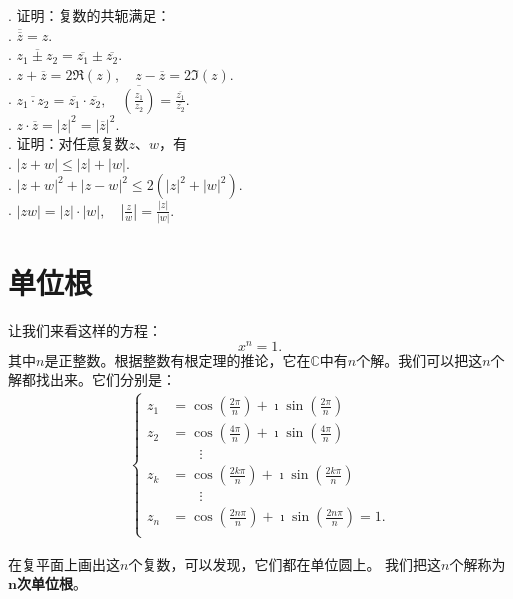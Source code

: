 \documentclass[12pt,UTF8]{ctexbook}
\begin{document}
\begin{xt}
    . 证明：复数的共轭满足：\\
    . $ \overline{\overline{z}} = z.$ \\
    . $ \overline{z_1 \pm z_2} = \overline{z_1}\pm \overline{z_2}.$ \\
    . $ z + \overline{z} = 2\Re(z), \quad z - \overline{z} = 2\Im(z).$\\
    . $\displaystyle\overline{z_1 \cdot z_2} = \overline{z_1}\cdot \overline{z_2}, \quad \overline{\left(\frac{z_1}{z_2}\right)} = \frac{\overline{z_1}}{\overline{z_2}}.$ \\
    . $ z\cdot \overline{z} = |z|^2 = |\overline{z}|^2.$ \\
    . 证明：对任意复数$z$、$w$，有\\
    . $ |z + w| \leqslant |z| + |w|.$ \\
    . $ |z + w|^2 + |z - w|^2 \leqslant 2(|z|^2 + |w|^2).$ \\
    . $ \displaystyle|zw| = |z|\cdot |w|, \quad \left|\frac{z}{w}\right| = \frac{|z|}{|w|}. $
\end{xt}

\section{单位根}

让我们来看这样的方程：
$$ x^n = 1.$$
其中$n$是正整数。根据整数有根定理的推论，它在$\mathbb{C}$中有$n$个解。我们可以把这$n$个解都找出来。它们分别是：
\begin{align*}
    \begin{cases}
        z_1 &= \cos{\left(\frac{2\pi}{n}\right)} + \imath \sin{\left(\frac{2\pi}{n}\right)} \\
        z_2 &= \cos{\left(\frac{4\pi}{n}\right)} + \imath \sin{\left(\frac{4\pi}{n}\right)} \\
        & \quad\quad \vdots \\[-4pt]
        z_k &= \cos{\left(\frac{2k\pi}{n}\right)} + \imath \sin{\left(\frac{2k\pi}{n}\right)} \\
        & \quad\quad \vdots \\[-4pt]
        z_n &= \cos{\left(\frac{2n\pi}{n}\right)} + \imath \sin{\left(\frac{2n\pi}{n}\right)} = 1. \\
    \end{cases}
\end{align*}

在复平面上画出这$n$个复数，可以发现，它们都在单位圆上。
我们把这$n$个解称为$\boldsymbol{n}$\textbf{次单位根}。
\end{document}
